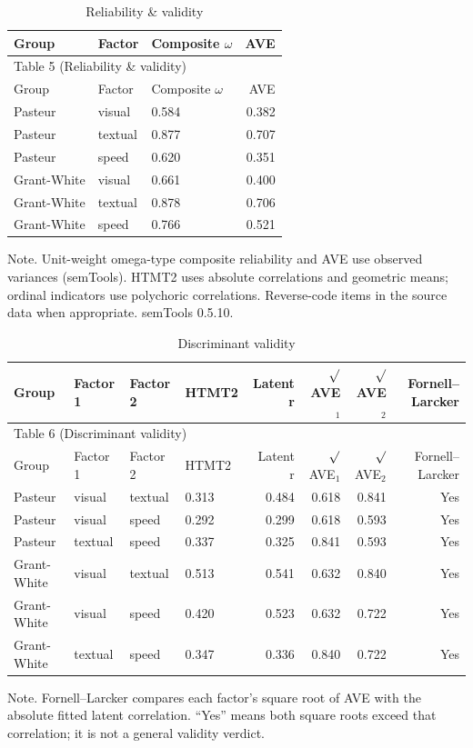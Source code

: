\documentclass[11pt]{article}
\begin{document}
\small
\begin{longtable}{lllr}
\caption{Reliability \& validity}\\
\toprule
Group & Factor & Composite $\omega$ & AVE \\
\midrule
\endfirsthead
\multicolumn{4}{l}{Table 5 (Reliability \& validity)} \\
\toprule
Group & Factor & Composite $\omega$ & AVE \\
\midrule
\endhead
Pasteur & visual & 0.584 & 0.382 \\
Pasteur & textual & 0.877 & 0.707 \\
Pasteur & speed & 0.620 & 0.351 \\
Grant-White & visual & 0.661 & 0.400 \\
Grant-White & textual & 0.878 & 0.706 \\
Grant-White & speed & 0.766 & 0.521 \\
\bottomrule
\end{longtable}
\noindent Note. Unit-weight omega-type composite reliability and AVE use observed variances (semTools). HTMT2 uses absolute correlations and geometric means; ordinal indicators use polychoric correlations. Reverse-code items in the source data when appropriate. semTools 0.5.10.\par

\begin{landscape}
\small
\begin{longtable}{llllrrrr}
\caption{Discriminant validity}\\
\toprule
Group & Factor 1 & Factor 2 & HTMT2 & Latent r & $\surd$AVE$_{1}$ & $\surd$AVE$_{2}$ & Fornell–Larcker \\
\midrule
\endfirsthead
\multicolumn{8}{l}{Table 6 (Discriminant validity)} \\
\toprule
Group & Factor 1 & Factor 2 & HTMT2 & Latent r & $\surd$AVE$_{1}$ & $\surd$AVE$_{2}$ & Fornell–Larcker \\
\midrule
\endhead
Pasteur & visual & textual & 0.313 & 0.484 & 0.618 & 0.841 & Yes \\
Pasteur & visual & speed & 0.292 & 0.299 & 0.618 & 0.593 & Yes \\
Pasteur & textual & speed & 0.337 & 0.325 & 0.841 & 0.593 & Yes \\
Grant-White & visual & textual & 0.513 & 0.541 & 0.632 & 0.840 & Yes \\
Grant-White & visual & speed & 0.420 & 0.523 & 0.632 & 0.722 & Yes \\
Grant-White & textual & speed & 0.347 & 0.336 & 0.840 & 0.722 & Yes \\
\bottomrule
\end{longtable}
\noindent Note. Fornell–Larcker compares each factor's square root of AVE with the absolute fitted latent correlation. “Yes” means both square roots exceed that correlation; it is not a general validity verdict.\par
\end{landscape}
\end{document}
